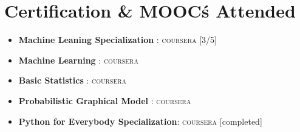 \documentclass[letterpaper,11pt]{article}
\newcommand{\resumeItem}[2]{
	\item\small{
		\textbf{#1}{: #2 \vspace{-2pt}}
	}
}
\newcommand{\resumeSubItem}[2]{\resumeItem{#1}{#2}\vspace{-4pt}}
\newcommand{\resumeSubHeadingListStart}{\begin{itemize}[leftmargin=*]}
\newcommand{\resumeSubHeadingListEnd}{\end{itemize}}
\begin{document}
	
	
	\section{Certification \& MOOC\' s Attended}
	
	\resumeSubHeadingListStart
	\resumeSubItem{Machine Leaning Specialization } \hfill \textsc{coursera} [3/5]
	\resumeSubItem{Machine Learning } \hfill\textsc{coursera}
	\resumeSubItem{Basic Statistics } \hfill\textsc{coursera}
	\resumeSubItem{Probabilistic Graphical Model } \hfill\textsc{coursera}
	\resumeSubItem{Python for Everybody Specialization} \hfill\textsc{coursera} [completed]
	
	\resumeSubHeadingListEnd
	

	
\end{document}
